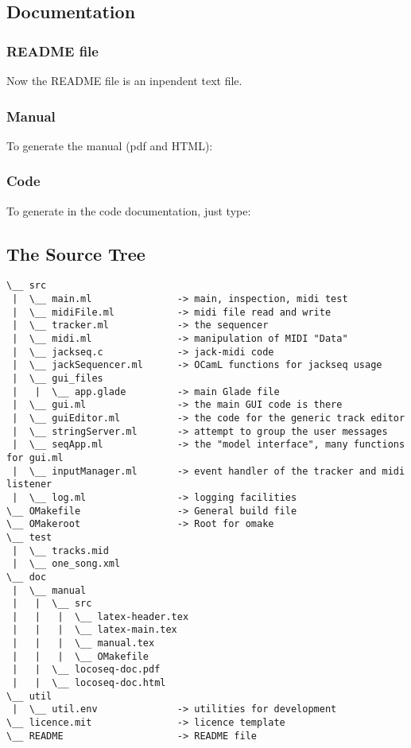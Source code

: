 \subsection{Documentation}

\subsubsection{README file}

Now the README file is an inpendent text file.

\subsubsection{Manual}

To generate the manual (pdf and HTML):


\subsubsection{Code}

To generate in  the code documentation, just type:



\subsection{The Source Tree}

\begin{verbatim}
\__ src                                        
 |  \__ main.ml               -> main, inspection, midi test
 |  \__ midiFile.ml           -> midi file read and write
 |  \__ tracker.ml            -> the sequencer
 |  \__ midi.ml               -> manipulation of MIDI "Data"
 |  \__ jackseq.c             -> jack-midi code
 |  \__ jackSequencer.ml      -> OCamL functions for jackseq usage
 |  \__ gui_files                   
 |   |  \__ app.glade         -> main Glade file
 |  \__ gui.ml                -> the main GUI code is there
 |  \__ guiEditor.ml          -> the code for the generic track editor
 |  \__ stringServer.ml       -> attempt to group the user messages
 |  \__ seqApp.ml             -> the "model interface", many functions for gui.ml 
 |  \__ inputManager.ml       -> event handler of the tracker and midi listener
 |  \__ log.ml                -> logging facilities
\__ OMakefile                 -> General build file
\__ OMakeroot                 -> Root for omake
\__ test                                       
 |  \__ tracks.mid  
 |  \__ one_song.xml                             
\__ doc
 |  \__ manual
 |   |  \__ src
 |   |   |  \__ latex-header.tex
 |   |   |  \__ latex-main.tex
 |   |   |  \__ manual.tex
 |   |   |  \__ OMakefile
 |   |  \__ locoseq-doc.pdf
 |   |  \__ locoseq-doc.html
\__ util                      
 |  \__ util.env              -> utilities for development
\__ licence.mit               -> licence template
\__ README                    -> README file
\end{verbatim}


